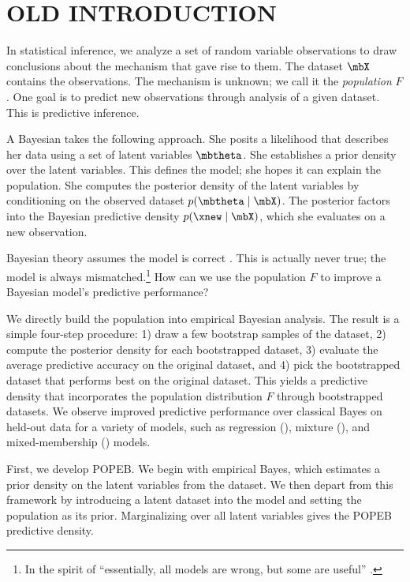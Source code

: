 
\section{OLD INTRODUCTION}

In statistical inference, we analyze a set of random variable
observations to draw conclusions about the mechanism that gave rise to
them. The dataset $\mbX$ contains the observations. The mechanism is
unknown; we call it the \emph{population} $F$. One goal is to predict
new observations through analysis of a given dataset.  This is
predictive inference.

A Bayesian takes the following approach. She posits a likelihood that
describes her data using a set of latent variables $\mbtheta$. She
establishes a prior density over the latent variables. This defines
the model; she hopes it can explain the population. She computes the
posterior density of the latent variables by conditioning on the
observed dataset $p(\mbtheta\mid\mbX)$.  The posterior factors into
the Bayesian predictive density $p(\xnew\mid\mbX)$, which she
evaluates on a new observation.

Bayesian theory assumes the model is correct
\citep{bernardo2000bayesian}.  This is actually never true; the model
is always mismatched.\footnote{In the spirit of ``essentially, all
  models are wrong, but some are useful'' \citep{box1987empirical}.}
How can we use the population $F$ to improve a Bayesian model's
predictive performance?

We directly build the population into empirical Bayesian analysis.
The result is a simple four-step procedure: 1) draw a few bootstrap
samples of the dataset, 2) compute the posterior density for each
bootstrapped dataset, 3) evaluate the average predictive accuracy on
the original dataset, and 4) pick the bootstrapped dataset that
performs best on the original dataset. This yields a predictive
density that incorporates the population distribution $F$ through
bootstrapped datasets.  We observe improved predictive performance
over classical Bayes on held-out data for a variety of models, such as
regression (), mixture (), and
mixed-membership () models.

First, we develop \gls{POPEB}. We begin with empirical Bayes, which
estimates a prior density on the latent variables from the dataset. We
then depart from this framework by introducing a latent dataset into
the model and setting the population as its prior. Marginalizing over
all latent variables gives the \gls{POPEB} predictive density.

